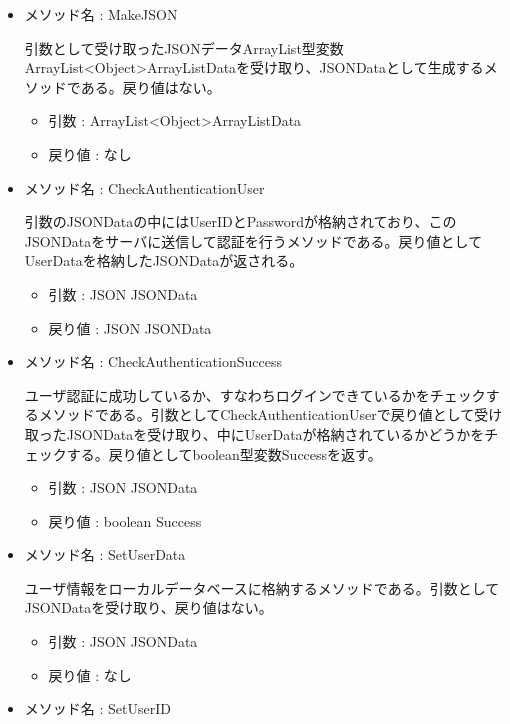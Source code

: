 \documentclass[a4j]{jarticle}
\begin{document}
\begin{itemize}

\item メソッド名 : MakeJSON

  引数として受け取ったJSONデータArrayList型変数ArrayList\textless Object\textgreater ArrayListDataを受け取り、JSONDataとして生成するメソッドである。戻り値はない。
  \begin{itemize}
  \item 引数 : ArrayList\textless Object\textgreater ArrayListData
		\item 戻り値 : なし
	\end{itemize}

    \item メソッド名 : CheckAuthenticationUser

	引数のJSONDataの中にはUserIDとPasswordが格納されており、このJSONDataをサーバに送信して認証を行うメソッドである。戻り値としてUserDataを格納したJSONDataが返される。

     \begin{itemize}
		\item 引数 : JSON JSONData
		\item 戻り値 : JSON JSONData
	\end{itemize}

     \item メソッド名 : CheckAuthenticationSuccess

	ユーザ認証に成功しているか、すなわちログインできているかをチェックするメソッドである。引数としてCheckAuthenticationUserで戻り値として受け取ったJSONDataを受け取り、中にUserDataが格納されているかどうかをチェックする。戻り値としてboolean型変数Successを返す。
      \begin{itemize}
		 \item 引数 : JSON JSONData
		 \item 戻り値 : boolean Success
	 \end{itemize}

     \item メソッド名 : SetUserData

	ユーザ情報をローカルデータベースに格納するメソッドである。引数としてJSONDataを受け取り、戻り値はない。
     \begin{itemize}
		\item 引数 : JSON JSONData
		\item 戻り値 : なし
	\end{itemize}

	\item メソッド名 : SetUserID


\end{itemize}
\end{document}
